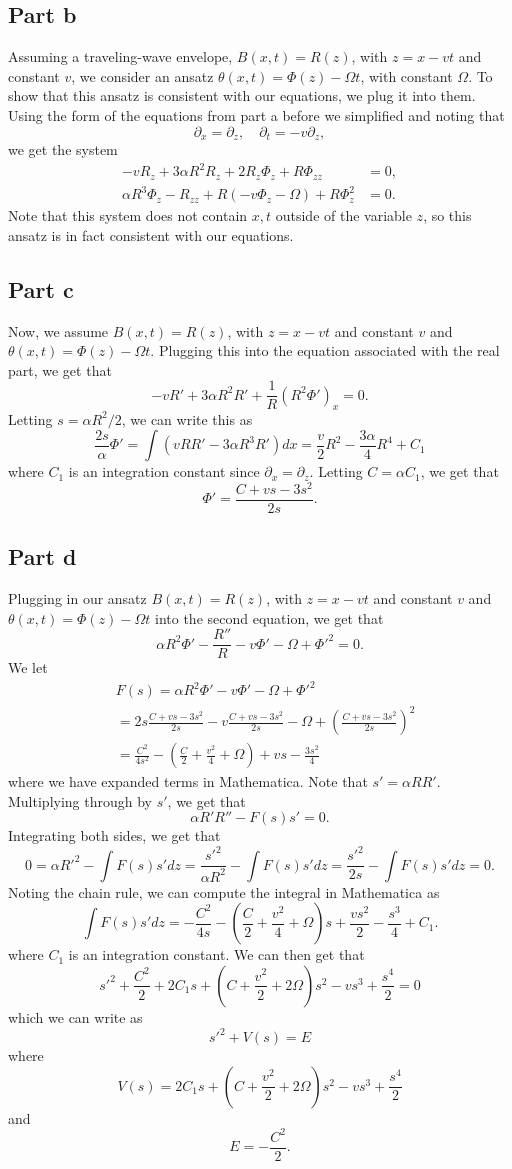 \documentclass{article}
\begin{document}
\subsection{Part b}
Assuming a traveling-wave envelope, $B(x,t)=R(z)$, with $z=x-vt$  and constant $v$, we consider an ansatz $\theta(x,t)=\Phi(z)-\Omega t$, with constant $\Omega$. To show that this ansatz is consistent with our equations, we plug it into them. Using the form of the equations from part a before we simplified and noting that 
\[
\partial_x=\partial_z,\quad\partial_t=-v\partial_z,
\] we get the system 
\begin{align*}
	-vR_z+3\alpha R^2R_z+2R_z\Phi_z+R\Phi_{zz}&=0,\\
	\alpha R^3\Phi_z-R_{zz}+R(-v\Phi_z-\Omega)+R\Phi_z^2&=0.
\end{align*}
Note that this system does not contain $x,t$ outside of the variable $z$, so this ansatz is in fact consistent with our equations.

\subsection{Part c}
Now, we assume $B(x,t)=R(z)$, with $z=x-vt$  and constant $v$ and $\theta(x,t)=\Phi(z)-\Omega t$. Plugging this into the equation associated with the real part, we get that 
\[
-vR'+3\alpha R^2R'+\frac{1}{R}(R^2 \Phi')_x=0.
\]
Letting $s=\alpha R^2/2$, we can write this as
\[
\frac{2s}{\alpha}\Phi'=\int(vRR'-3\alpha R^3R')dx=\frac{v}{2}R^2-\frac{3\alpha}{4}R^4+C_1
\]
where $C_1$ is an integration constant since $\partial_x=\partial_z$. Letting $C=\alpha C_1$, we get that 
\[
\Phi'=\frac{C+vs-3s^2}{2s}.
\]
\subsection{Part d}
Plugging in our ansatz $B(x,t)=R(z)$, with $z=x-vt$  and constant $v$ and $\theta(x,t)=\Phi(z)-\Omega t$ into the second equation, we get that
\[
\alpha R^2\Phi'-\frac{R''}{R}-v\Phi'-\Omega+\Phi'^2=0.
\]
We let 
\begin{align*}
&F(s)=\alpha R^2\Phi'-v\Phi'-\Omega+\Phi'^2\\&
=2s\frac{C+vs-3s^2}{2s}-v\frac{C+vs-3s^2}{2s}-\Omega+\left(\frac{C+vs-3s^2}{2s}\right)^2\\&=
\frac{C^2}{4s^2}-\left(\frac{C}{2}+\frac{v^2}{4}+\Omega\right)+vs-\frac{3s^2}{4}
\end{align*}
where we have expanded terms in Mathematica. Note that $s'=\alpha RR'$. Multiplying through by $s'$, we get that 
\[
\alpha R'R''-F(s)s'=0.
\]
Integrating both sides, we get that 
\[
0=\alpha R'^2-\int F(s)s'dz=\frac{s'^2}{\alpha R^2}-\int F(s)s'dz=\frac{s'^2}{2s}-\int F(s)s'dz=0.
\]
Noting the chain rule, we can compute the integral in Mathematica as 
\[
\int F(s)s'dz=-\frac{C^2}{4s}-\left(\frac{C}{2}+\frac{v^2}{4}+\Omega\right)s+\frac{vs^2}{2}-\frac{s^3}{4}+C_1.
\]
where $C_1$ is an integration constant. We can then get that
\[
s'^2+\frac{C^2}{2}+2C_1s+\left(C+\frac{v^2}{2}+2\Omega\right)s^2-vs^3+\frac{s^4}{2}=0
\]
which we can write as 
\[
s'^2+V(s)=E
\]
where 
\[
V(s)=2C_1s+\left(C+\frac{v^2}{2}+2\Omega\right)s^2-vs^3+\frac{s^4}{2}
\]
and 
\[
E=-\frac{C^2}{2}.
\]
\end{document}
